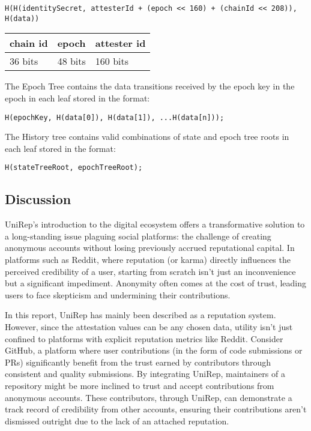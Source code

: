 \documentclass[11pt]{article}
\begin{document}
\begin{verbatim}
H(H(identitySecret, attesterId + (epoch << 160) + (chainId << 208)), H(data))
\end{verbatim}

\begin{center}
\begin{tabular}{lll}
chain id & epoch & attester id\\[0pt]
\hline
36 bits & 48 bits & 160 bits\\[0pt]
\end{tabular}
\end{center}

The Epoch Tree contains the data transitions received by the epoch key in the epoch in each leaf stored in the format:

\begin{verbatim}
H(epochKey, H(data[0]), H(data[1]), ...H(data[n]));
\end{verbatim}

The History tree contains valid combinations of state and epoch tree roots in each leaf stored in the format:

\begin{verbatim}
H(stateTreeRoot, epochTreeRoot);
\end{verbatim}
\subsection{Discussion}
\label{sec:org9b94eb0}

UniRep's introduction to the digital ecosystem offers a transformative solution to a long-standing issue plaguing social platforms: the challenge of creating anonymous accounts without losing previously accrued reputational capital. In platforms such as Reddit, where reputation (or karma) directly influences the perceived credibility of a user, starting from scratch isn't just an inconvenience but a significant impediment. Anonymity often comes at the cost of trust, leading users to face skepticism and undermining their contributions.

In this report, UniRep has mainly been described as a reputation system. However, since the attestation values can be any chosen data, utility isn't just confined to platforms with explicit reputation metrics like Reddit. Consider GitHub, a platform where user contributions (in the form of code submissions or PRs) significantly benefit from the trust earned by contributors through consistent and quality submissions. By integrating UniRep, maintainers of a repository might be more inclined to trust and accept contributions from anonymous accounts. These contributors, through UniRep, can demonstrate a track record of credibility from other accounts, ensuring their contributions aren't dismissed outright due to the lack of an attached reputation.
\end{document}
